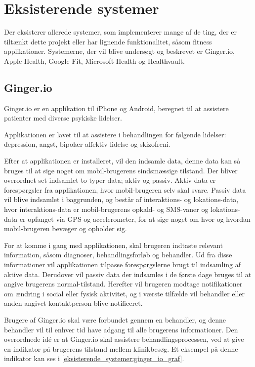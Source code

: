 \section{Eksisterende systemer}
Der eksisterer allerede systemer, som implementerer mange af de ting, der er tiltænkt dette projekt eller har lignende funktionalitet, såsom fitness applikationer. 
Systemerne, der vil blive undersøgt og beskrevet er Ginger.io, Apple Health, Google Fit, Microsoft Health og Healthvault.

\subsection{Ginger.io}
Ginger.io er en applikation til iPhone og Android, beregnet til at assistere patienter med diverse psykiske lidelser\citep{ginger_dot_io,gingerio_mit,gingerio_dailymail}.

Applikationen er lavet til at assistere i behandlingen for følgende lidelser: depression, angst, bipolær affektiv lidelse og skizofreni.

Efter at applikationen er installeret, vil den indsamle data, denne data kan så bruges til at sige noget om mobil-brugerens sindsmæssige tilstand.
Der bliver overordnet set indsamlet to typer data; aktiv og passiv.
Aktiv data er forespørgsler fra applikationen, hvor mobil-brugeren selv skal svare.
Passiv data vil blive indsamlet i baggrunden, og består af interaktions- og lokations-data, hvor interaktions-data er mobil-brugerens opkald- og SMS-vaner og lokations-data er opfanget via GPS og accelerometer, for at sige noget om hvor og hvordan mobil-brugeren bevæger og opholder sig.

For at komme i gang med applikationen, skal brugeren indtaste relevant information, såsom diagnoser, behandlingsforløb og behandler.
Ud fra disse informationer vil applikationen tilpasse forespørgslerne brugt til indsamling af aktive data.
Derudover vil passiv data der indsamles i de første dage bruges til at angive brugerens normal-tilstand.
Herefter vil brugeren modtage notifikationer om ændring i social eller fysisk aktivitet, og i værste tilfælde vil behandler eller anden angivet kontaktperson blive notificeret.

Brugere af Ginger.io skal være forbundet gennem en behandler, og denne behandler vil til enhver tid have adgang til alle brugerens informationer.
Den overordnede idé er at Ginger.io skal assistere behandlingsprocessen, ved at give en indikator på brugerens tilstand mellem klinikbesøg. 
Et eksempel på denne indikator kan ses i \cref{eksisterende_systemer:ginger_io_graf}.

